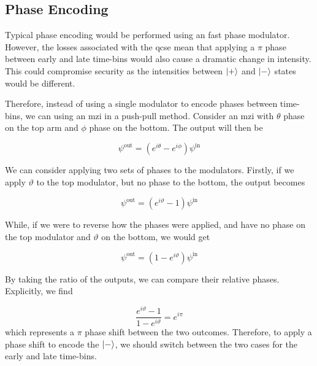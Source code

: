 \subsection{Phase Encoding}

Typical phase encoding would be performed using an fast phase modulator. However, the losses associated with the \ac{qcse} mean that applying a $\pi$ phase between early and late time-bins would also cause a dramatic change in intensity. This could compromise security as the intensities between $\ket{+}$ and $\ket{-}$ states would be different. 

Therefore, instead of using a single modulator to encode phases between time-bins, we can using an \ac{mzi} in a push-pull method. Consider an \ac{mzi} with $\theta$ phase on the top arm and $\phi$ phase on the bottom. The output will then be 

\begin{equation}
	\psi^\mathrm{out} =  \left(e^{i\theta} - e^{i\phi}\right) \psi^\mathrm{in}
\end{equation}

We can consider applying two sets of phases to the modulators. Firstly, if we apply $\vartheta$ to the top modulator, but no phase to the bottom, the output becomes

\begin{equation}
	\psi^\mathrm{out} =  \left(e^{i\vartheta} -1\right) \psi^\mathrm{in}
\end{equation}

While, if we were to reverse how the phases were applied, and have no phase on the top modulator and $\vartheta$ on the bottom, we would get

\begin{equation}
	\psi^\mathrm{out} =  \left(1 - e^{i\vartheta}\right) \psi^\mathrm{in}
\end{equation}

By taking the ratio of the outputs, we can compare their relative phases. Explicitly, we find

\begin{equation}
	\frac{e^{i\vartheta} -1}{1 - e^{i\vartheta}} = e^{i\pi}
\end{equation}
which represents a $\pi$ phase shift between the two outcomes. Therefore, to apply a phase shift to encode the $\ket{-}$, we should switch between the two cases for the early and late time-bins.


